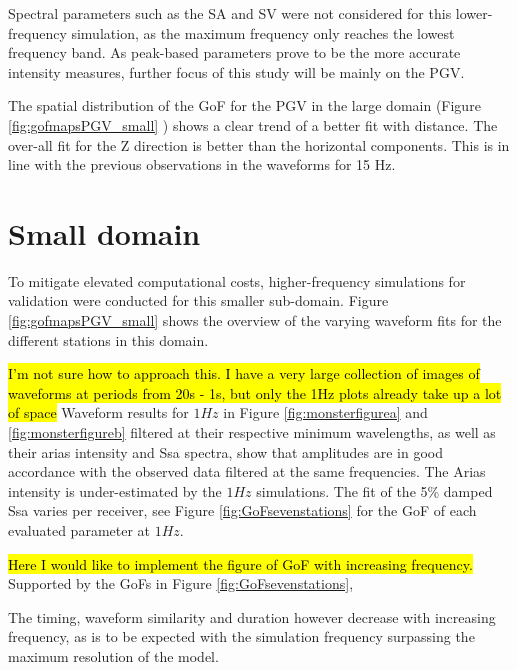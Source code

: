 \documentclass[../Text/00main.tex]{subfiles}
\begin{document}
Spectral parameters such as the SA and SV were not considered for this lower-frequency simulation, as the maximum frequency only reaches the lowest frequency band. As peak-based parameters prove to be the more accurate intensity measures, further focus of this study  will be mainly on the PGV.

The spatial distribution of the GoF for the PGV in the large domain (Figure \ref{fig:gofmapsPGV_small} ) shows a clear trend of a better fit with distance. The over-all fit for the Z direction is better than the horizontal components. This is in line with the previous observations in the waveforms for 15 Hz. 

\section{Small domain}

To mitigate elevated computational costs, higher-frequency simulations for validation were conducted for this smaller sub-domain. Figure \ref{fig:gofmapsPGV_small} shows the overview of the varying waveform fits for the different stations in this domain.  

\hl{I'm not sure how to approach this. I have a very large collection of images of waveforms at periods from 20s - 1s, but only the 1Hz plots already take up a lot of space} Waveform results for $1 Hz$ in Figure \ref{fig:monsterfigurea} and \ref{fig:monsterfigureb} filtered at their respective minimum wavelengths, as well as their arias intensity and Ssa spectra, show that amplitudes are in good accordance with the observed data filtered at the same frequencies. The Arias intensity is under-estimated by the $1 Hz$ simulations. The fit of the 5\% damped Ssa varies per receiver, see Figure \ref{fig:GoFsevenstations} for the GoF of each evaluated parameter at $1 Hz$. 

\hl{Here I would like to implement the figure of GoF with increasing frequency.}
Supported by the GoFs in Figure \ref{fig:GoFsevenstations}, 

The timing, waveform similarity and duration however decrease with increasing frequency, as is to be expected with the simulation frequency surpassing the maximum resolution of the model. 
\end{document}
